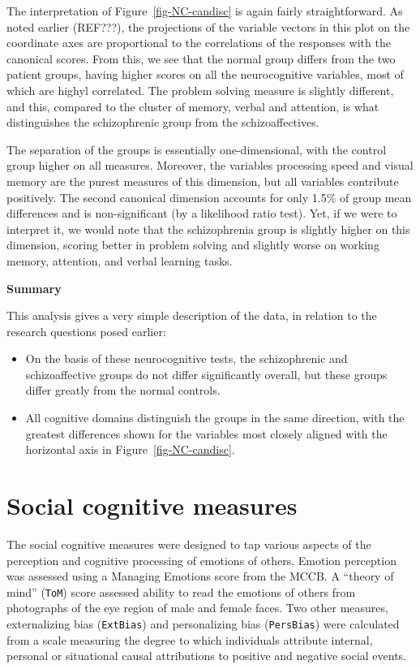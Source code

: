 \documentclass[
  letterpaper,
  10pt,
  krantz2]{krantz}
\begin{document}
The interpretation of Figure~\ref{fig-NC-candisc} is again fairly
straightforward. As noted earlier (REF???), the projections of the
variable vectors in this plot on the coordinate axes are proportional to
the correlations of the responses with the canonical scores. From this,
we see that the normal group differs from the two patient groups, having
higher scores on all the neurocognitive variables, most of which are
highyl correlated. The problem solving measure is slightly different,
and this, compared to the cluster of memory, verbal and attention, is
what distinguishes the schizophrenic group from the schizoaffectives.

The separation of the groups is essentially one-dimensional, with the
control group higher on all measures. Moreover, the variables processing
speed and visual memory are the purest measures of this dimension, but
all variables contribute positively. The second canonical dimension
accounts for only 1.5\% of group mean differences and is non-significant
(by a likelihood ratio test). Yet, if we were to interpret it, we would
note that the schizophrenia group is slightly higher on this dimension,
scoring better in problem solving and slightly worse on working memory,
attention, and verbal learning tasks.

\textbf{Summary}

This analysis gives a very simple description of the data, in relation
to the research questions posed earlier:

\begin{itemize}
\item
  On the basis of these neurocognitive tests, the schizophrenic and
  schizoaffective groups do not differ significantly overall, but these
  groups differ greatly from the normal controls.
\item
  All cognitive domains distinguish the groups in the same direction,
  with the greatest differences shown for the variables most closely
  aligned with the horizontal axis in Figure~\ref{fig-NC-candisc}.
\end{itemize}

\hypertarget{social-cognitive-measures}{%
\section{Social cognitive measures}\label{social-cognitive-measures}}

The social cognitive measures were designed to tap various aspects of
the perception and cognitive processing of emotions of others. Emotion
perception was assessed using a Managing Emotions score from the MCCB. A
``theory of mind'' (\texttt{ToM}) score assessed ability to read the
emotions of others from photographs of the eye region of male and female
faces. Two other measures, externalizing bias (\texttt{ExtBias}) and
personalizing bias (\texttt{PersBias}) were calculated from a scale
measuring the degree to which individuals attribute internal, personal
or situational causal attributions to positive and negative social
events.
\end{document}
